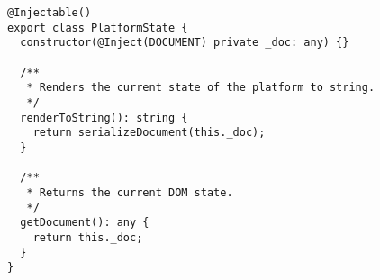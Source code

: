 \begin{verbatim}
@Injectable()
export class PlatformState {
  constructor(@Inject(DOCUMENT) private _doc: any) {}

  /**
   * Renders the current state of the platform to string.
   */
  renderToString(): string {
    return serializeDocument(this._doc);
  }

  /**
   * Returns the current DOM state.
   */
  getDocument(): any {
    return this._doc;
  }
}
\end{verbatim}
